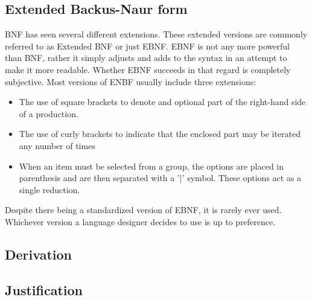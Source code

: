 \subsection{Extended Backus-Naur form}

BNF has seen several different extensions.
These extended versions are commonly referred to as Extended BNF or just EBNF.
EBNF is not any more powerful than BNF, rather it simply adjusts and adds to the syntax in an attempt to make it more readable.
Whether EBNF succeeds in that regard is completely subjective.
Most versions of ENBF usually include three extensions:
\begin{itemize}
    \item The use of square brackets to denote and optional part of the right-hand side of a production.
    \item The use of curly brackets to indicate that the enclosed part may be iterated any number of times
    \item When an item must be selected from a group, the options are placed in parenthesis and are then separated with a '|' symbol. These options act as a single reduction.
\end{itemize}

Despite there being a standardized version of EBNF, it is rarely ever used. Whichever version a language designer decides to use is up to preference\cite{sebesta_concepts_2016}.

\subsection{Derivation}


\subsection{Justification}
